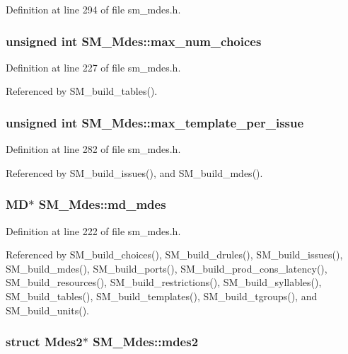 Definition at line 294 of file sm\_\-mdes.h.
\subsubsection{\setlength{\rightskip}{0pt plus 5cm}unsigned int \bf{SM\_\-Mdes::max\_\-num\_\-choices}}\label{structSM__Mdes_47cd4a0fd13340c3e39d3967015b1c85}




Definition at line 227 of file sm\_\-mdes.h.

Referenced by SM\_\-build\_\-tables().
\subsubsection{\setlength{\rightskip}{0pt plus 5cm}unsigned int \bf{SM\_\-Mdes::max\_\-template\_\-per\_\-issue}}\label{structSM__Mdes_1d6622cd0366e1f8aa205d170c587427}




Definition at line 282 of file sm\_\-mdes.h.

Referenced by SM\_\-build\_\-issues(), and SM\_\-build\_\-mdes().
\subsubsection{\setlength{\rightskip}{0pt plus 5cm}\bf{MD}$\ast$ \bf{SM\_\-Mdes::md\_\-mdes}}\label{structSM__Mdes_bdc3de19a29cf4150d1bd1e981855ead}




Definition at line 222 of file sm\_\-mdes.h.

Referenced by SM\_\-build\_\-choices(), SM\_\-build\_\-drules(), SM\_\-build\_\-issues(), SM\_\-build\_\-mdes(), SM\_\-build\_\-ports(), SM\_\-build\_\-prod\_\-cons\_\-latency(), SM\_\-build\_\-resources(), SM\_\-build\_\-restrictions(), SM\_\-build\_\-syllables(), SM\_\-build\_\-tables(), SM\_\-build\_\-templates(), SM\_\-build\_\-tgroups(), and SM\_\-build\_\-units().
\subsubsection{\setlength{\rightskip}{0pt plus 5cm}struct \bf{Mdes2}$\ast$ \bf{SM\_\-Mdes::mdes2}}\label{structSM__Mdes_90d730725db5d7f393f02563a6f1408b}




